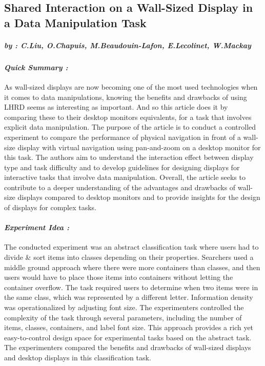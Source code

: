 \subsection*{Shared Interaction on a Wall-Sized Display in a Data Manipulation Task}
    \subparagraph{by : C.Liu, O.Chapuis, M.Beaudouin-Lafon, E.Lecolinet, W.Mackay}
    \cite{liu2016shared}

    \begin{multicols}{2}
        \paragraph{ \textit{Quick Summary :} 
                \newline }
        \indent \indent As wall-sized displays are now becoming one of the most used technologies when it comes to data manipulations, knowing the benefits and drawbacks of using LHRD seems as interesting as important. And so this article does 
        it by comparing these to their desktop monitors  equivalents, for a task that involves explicit data manipulation. The purpose of the article is to conduct a controlled experiment to compare the performance of physical navigation in 
        front of a wall-size display with virtual navigation using pan-and-zoom on a desktop monitor for this task. The authors aim to understand the interaction effect between display type and task difficulty and to develop guidelines 
        for designing displays for interactive tasks that involve data manipulation. Overall, the article seeks to contribute to a deeper understanding of the advantages and drawbacks of wall-size displays compared to desktop monitors and to 
        provide insights for the design of displays for complex tasks.

        \paragraph{ \textit{Experiment Idea :} 
                \newline }
        \indent \indent The conducted experiment was an abstract classification task where users had to divide \& sort items into classes depending on their properties. Searchers used a middle ground approach where there were more containers than classes, 
        and then users would have to place those items into containers without letting the container overflow. The task required users to determine when two items were in the same class, which was represented by a different letter. Information density was 
        operationalized by adjusting font size. The experimenters controlled the complexity of the task through several parameters, including the number of items, classes, containers, and label font size. This approach provides a rich yet easy-to-control 
        design space for experimental tasks based on the abstract task. The experimenters compared the benefits and drawbacks of wall-sized displays and desktop displays in this classification task.


\end{multicols}
